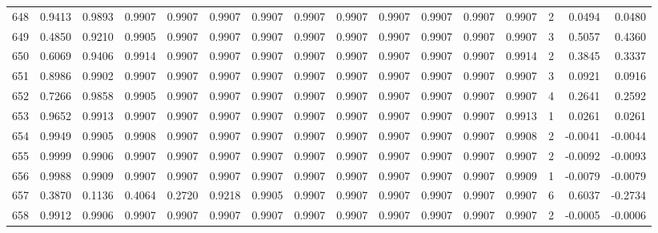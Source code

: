 \begin{tabular}{lrrrrrrrrrrrrrrr}
648 &      0.9413 &  0.9893 &  0.9907 &  0.9907 &  0.9907 &  0.9907 &  0.9907 &  0.9907 &  0.9907 &  0.9907 &   0.9907 &     0.9907 &      2 &                    0.0494 &                     0.0480 \\
649 &      0.4850 &  0.9210 &  0.9905 &  0.9907 &  0.9907 &  0.9907 &  0.9907 &  0.9907 &  0.9907 &  0.9907 &   0.9907 &     0.9907 &      3 &                    0.5057 &                     0.4360 \\
650 &      0.6069 &  0.9406 &  0.9914 &  0.9907 &  0.9907 &  0.9907 &  0.9907 &  0.9907 &  0.9907 &  0.9907 &   0.9907 &     0.9914 &      2 &                    0.3845 &                     0.3337 \\
651 &      0.8986 &  0.9902 &  0.9907 &  0.9907 &  0.9907 &  0.9907 &  0.9907 &  0.9907 &  0.9907 &  0.9907 &   0.9907 &     0.9907 &      3 &                    0.0921 &                     0.0916 \\
652 &      0.7266 &  0.9858 &  0.9905 &  0.9907 &  0.9907 &  0.9907 &  0.9907 &  0.9907 &  0.9907 &  0.9907 &   0.9907 &     0.9907 &      4 &                    0.2641 &                     0.2592 \\
653 &      0.9652 &  0.9913 &  0.9907 &  0.9907 &  0.9907 &  0.9907 &  0.9907 &  0.9907 &  0.9907 &  0.9907 &   0.9907 &     0.9913 &      1 &                    0.0261 &                     0.0261 \\
654 &      0.9949 &  0.9905 &  0.9908 &  0.9907 &  0.9907 &  0.9907 &  0.9907 &  0.9907 &  0.9907 &  0.9907 &   0.9907 &     0.9908 &      2 &                   -0.0041 &                    -0.0044 \\
655 &      0.9999 &  0.9906 &  0.9907 &  0.9907 &  0.9907 &  0.9907 &  0.9907 &  0.9907 &  0.9907 &  0.9907 &   0.9907 &     0.9907 &      2 &                   -0.0092 &                    -0.0093 \\
656 &      0.9988 &  0.9909 &  0.9907 &  0.9907 &  0.9907 &  0.9907 &  0.9907 &  0.9907 &  0.9907 &  0.9907 &   0.9907 &     0.9909 &      1 &                   -0.0079 &                    -0.0079 \\
657 &      0.3870 &  0.1136 &  0.4064 &  0.2720 &  0.9218 &  0.9905 &  0.9907 &  0.9907 &  0.9907 &  0.9907 &   0.9907 &     0.9907 &      6 &                    0.6037 &                    -0.2734 \\
658 &      0.9912 &  0.9906 &  0.9907 &  0.9907 &  0.9907 &  0.9907 &  0.9907 &  0.9907 &  0.9907 &  0.9907 &   0.9907 &     0.9907 &      2 &                   -0.0005 &                    -0.0006 \\

\end{tabular}
